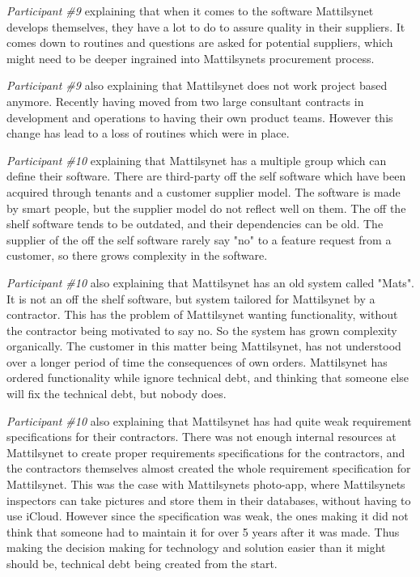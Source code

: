 \textit{Participant \#9} explaining that when it comes to the software Mattilsynet develops themselves, they have a lot to do to assure quality in their suppliers. It comes down to routines and questions are asked for potential suppliers, which might need to be deeper ingrained into Mattilsynets procurement process.

\textit{Participant \#9} also explaining that Mattilsynet does not work project based anymore. Recently having moved from two large consultant contracts in development and operations to having their own product teams. However this change has lead to a loss of routines which were in place.

\textit{Participant \#10} explaining that Mattilsynet has a multiple group which can define their software. There are third-party off the self software which have been acquired through tenants and a customer supplier model. The software is made by smart people, but the supplier model do not reflect well on them. The off the shelf software tends to be outdated, and their dependencies can be old. The supplier of the off the self software rarely say "no" to a feature request from a customer, so there grows complexity in the software.

\textit{Participant \#10} also explaining that Mattilsynet has an old system called "Mats". It is not an off the shelf software, but system tailored for Mattilsynet by a contractor. This has the problem of Mattilsynet wanting functionality, without the contractor being motivated to say no. So the system has grown complexity organically. The customer in this matter being Mattilsynet, has not understood over a longer period of time the consequences of own orders. Mattilsynet has ordered functionality while ignore technical debt, and thinking that someone else will fix the technical debt, but nobody does.

\textit{Participant \#10} also explaining that Mattilsynet has had quite weak requirement specifications for their contractors. There was not enough internal resources at Mattilsynet to create proper requirements specifications for the contractors, and the contractors themselves almost created the whole requirement specification for Mattilsynet. This was the case with Mattilsynets photo-app, where Mattilsynets inspectors can take pictures and store them in their databases, without having to use iCloud. However since the specification was weak, the ones making it did not think that someone had to maintain it for over 5 years after it was made. Thus making the decision making for technology and solution easier than it might should be, technical debt being created from the start.

